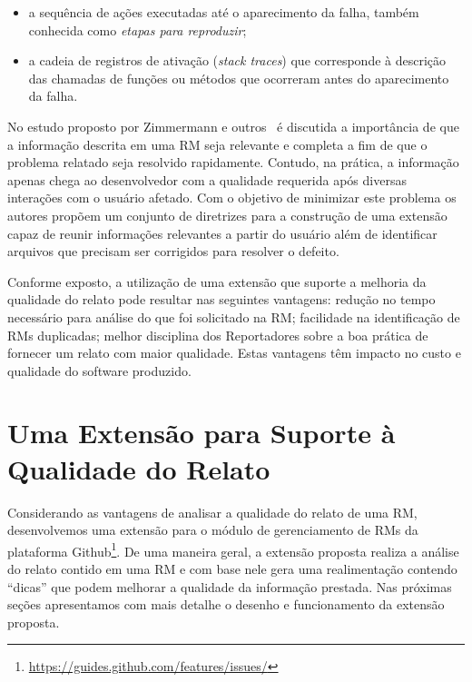 \begin{itemize}
    \item a sequência de ações executadas até o aparecimento da falha, também
        conhecida como \textit{etapas para reproduzir};
    \item a cadeia de registros de ativação (\textit{stack traces}) que
        corresponde à descrição das chamadas de funções ou métodos que
        ocorreram antes do aparecimento da falha.
\end{itemize}

No estudo proposto por Zimmermann e outros~\cite{5070993} é discutida a
importância de que a informação descrita em uma RM seja relevante e completa a
fim de que o problema relatado seja resolvido rapidamente.  Contudo, na prática,
a informação apenas chega ao desenvolvedor com a qualidade requerida após
diversas interações com o usuário afetado. Com o objetivo de minimizar este
problema os autores propõem um conjunto de diretrizes para a construção de uma
extensão capaz de reunir informações relevantes a partir do usuário além de
identificar arquivos que precisam ser corrigidos para resolver o defeito.

Conforme exposto, a utilização de uma extensão que suporte a melhoria da
qualidade do relato pode resultar nas seguintes vantagens: redução no tempo
necessário para análise do que foi solicitado na RM\@; facilidade na
identificação de RMs duplicadas; melhor disciplina dos Reportadores sobre a boa
prática de fornecer um relato com maior qualidade. Estas vantagens têm impacto
no custo e qualidade do software produzido.

\section{Uma Extensão para Suporte à Qualidade do Relato}
\label{sec:uma_extensao_suporte_qualidade_relato}

Considerando as vantagens de analisar a qualidade do relato de uma RM,
desenvolvemos uma extensão para o módulo de gerenciamento de RMs da plataforma
Github\footnote{\url{https://guides.github.com/features/issues/}}. De uma
maneira geral, a extensão proposta realiza a análise do relato contido em uma RM
e com base nele gera uma realimentação contendo ``dicas'' que podem melhorar a
qualidade da informação prestada. Nas próximas seções apresentamos com mais
detalhe o desenho e funcionamento da extensão proposta.


